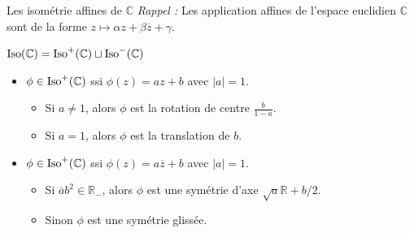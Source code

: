 \documentclass[bigger]{m53beamer}
\begin{document}
\begin{frame}{Les isométrie affines de $\mathbb{C}$}
  \textit{Rappel :} Les application affines de l'espace euclidien $\mathbb{C}$ sont de la forme $z \mapsto \alpha z+\beta\overline{z}+\gamma$.\pause\medskip

  $\operatorname{Iso}(\mathbb{C}) = \operatorname{Iso}^{+}(\mathbb{C}) \sqcup \operatorname{Iso}^{-}(\mathbb{C})$
  \begin{itemize}[<+(1)->]
    \item $\phi \in \operatorname{Iso}^{+}(\mathbb{C})$ ssi $\phi(z)=az+b$ avec $|a|=1$.
      \begin{itemize}[<+(1)->]
        \item Si $a \neq 1$, alors $\phi$ est la rotation de centre $\frac{b}{1-a}$.
        \item Si $a=1$, alors $\phi$ est la translation de $b$.
      \end{itemize}
    \item $\phi \in \operatorname{Iso}^{+}(\mathbb{C})$ ssi $\phi(z)=a\overline{z}+b$ avec $|a|=1$.
      \begin{itemize}[<+(1)->]
        \item Si $\overline{a}b^{2} \in \mathbb{R}_{-}$, alors $\phi$ est une symétrie d'axe $\sqrt{a}\mathbb{R}+b/2$.
        \item Sinon $\phi$ est une symétrie glissée.
      \end{itemize}
  \end{itemize}
\end{frame}
\end{document}
